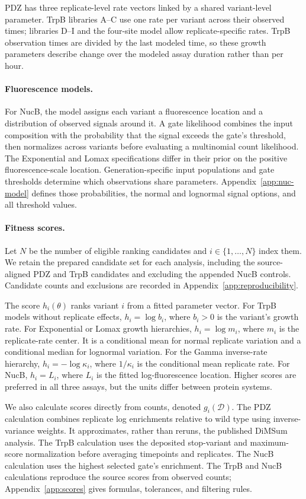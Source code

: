 \documentclass[11pt]{article}
\newcommand{\data}{\mathcal{D}}
\begin{document}
PDZ has three replicate-level rate vectors linked by a shared variant-level
parameter. TrpB libraries A--C use one rate per variant across their observed
times; libraries D--I and the four-site model allow replicate-specific rates.
TrpB observation times are divided by the last modeled time, so these growth
parameters describe change over the modeled assay duration rather than per hour.

\paragraph{Fluorescence models.}
For NucB, the model assigns each variant a fluorescence location and a
distribution of observed signals around it. A gate likelihood combines the
input composition with the probability that the signal exceeds the gate's
threshold, then normalizes across variants before evaluating a multinomial
count likelihood. The Exponential and Lomax specifications differ in their
prior on the positive fluorescence-scale location. Generation-specific input
populations and gate thresholds determine which observations share parameters.
Appendix~\ref{app:nuc-model} defines those probabilities, the normal and
lognormal signal options, and all threshold values.

\paragraph{Fitness scores.}
Let $N$ be the number of eligible ranking candidates and
$i\in\{1,\ldots,N\}$ index them. We retain the prepared candidate set for
each analysis, including the source-aligned PDZ and TrpB candidates and
excluding the appended NucB controls. Candidate counts and exclusions are
recorded in Appendix~\ref{app:reproducibility}.

The score $h_i(\theta)$ ranks variant $i$ from a fitted parameter vector.
For TrpB models without replicate effects, $h_i=\log b_i$, where $b_i>0$ is the variant's
growth rate. For Exponential or Lomax growth hierarchies, $h_i=\log m_i$,
where $m_i$ is the replicate-rate center. It is a conditional mean for normal
replicate variation and a conditional median for lognormal variation.
For the Gamma inverse-rate hierarchy, $h_i=-\log\kappa_i$, where
$1/\kappa_i$ is the conditional mean replicate rate. For NucB, $h_i=L_i$,
where $L_i$ is the fitted log-fluorescence location. Higher scores are
preferred in all three assays, but the units differ between protein systems.

We also calculate scores directly from counts, denoted $g_i(\data)$. The
PDZ calculation combines replicate log enrichments relative to wild type
using inverse-variance weights. It approximates, rather than reruns, the
published DiMSum analysis. The TrpB calculation uses the deposited stop-variant
and maximum-score normalization before averaging timepoints and replicates.
The NucB calculation uses the highest selected gate's enrichment. The TrpB
and NucB calculations reproduce the source scores from observed counts;
Appendix~\ref{app:scores} gives formulas, tolerances, and filtering rules.
\end{document}
